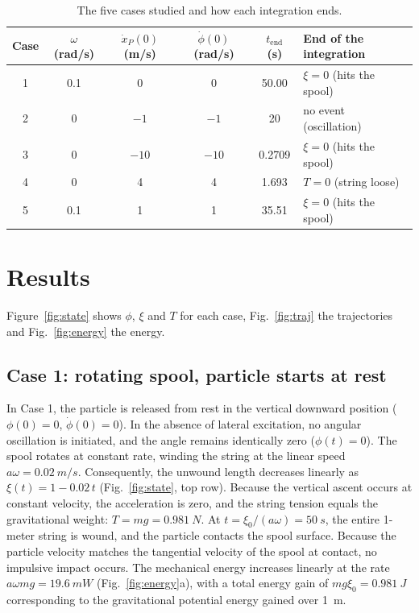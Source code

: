 \documentclass[11pt,a4paper]{article}
\newcommand{\dt}[1]{\dot{#1}}
\begin{document}
\begin{table}[htbp]
\centering
\caption{The five cases studied and how each integration ends.}\label{tab:cases}
\begin{tabular}{cccccl}
\toprule
Case & $\omega$ (rad/s) & $\dt x_P(0)$ (m/s) & $\dt\phi(0)$ (rad/s) & $t_{\text{end}}$ (s) & End of the integration\\
\midrule
1 & 0.1 & 0 & 0 & 50.00 & $\xi=0$ (hits the spool)\\
2 & 0 & $-1$ & $-1$ & 20 & no event (oscillation)\\
3 & 0 & $-10$ & $-10$ & 0.2709 & $\xi=0$ (hits the spool)\\
4 & 0 & 4 & 4 & 1.693 & $T=0$ (string loose)\\
5 & 0.1 & 1 & 1 & 35.51 & $\xi=0$ (hits the spool)\\
\bottomrule
\end{tabular}
\end{table}

\section{Results}\label{sec:results}
Figure~\ref{fig:state} shows $\phi$, $\xi$ and $T$ for each case, Fig.~\ref{fig:traj} the trajectories and Fig.~\ref{fig:energy} the energy.

\subsection{Case 1: rotating spool, particle starts at rest}
In Case 1, the particle is released from rest in the vertical downward position ($\phi(0)=0$, $\dt\phi(0)=0$). In the absence of lateral excitation, no angular oscillation is initiated, and the angle remains identically zero ($\phi(t)=0$). The spool rotates at constant rate, winding the string at the linear speed $a\omega = \SI{0.02}{m/s}$. Consequently, the unwound length decreases linearly as $\xi(t) = 1 - 0.02\,t$ (Fig.~\ref{fig:state}, top row). Because the vertical ascent occurs at constant velocity, the acceleration is zero, and the string tension equals the gravitational weight: $T = mg = \SI{0.981}{N}$. At $t = \xi_0/(a\omega) = \SI{50}{s}$, the entire 1-meter string is wound, and the particle contacts the spool surface. Because the particle velocity matches the tangential velocity of the spool at contact, no impulsive impact occurs. The mechanical energy increases linearly at the rate $a\omega mg = \SI{19.6}{mW}$ (Fig.~\ref{fig:energy}a), with a total energy gain of $mg\xi_0 = \SI{0.981}{J}$ corresponding to the gravitational potential energy gained over \SI{1}{m}.
\end{document}
